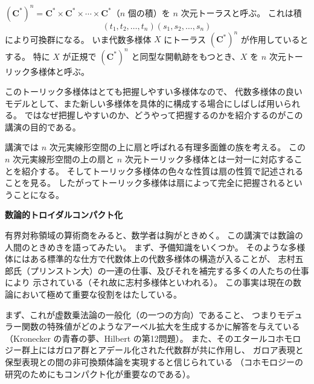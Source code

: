\documentclass[uplatex,dvipdfmx]{jlreq}
\begin{document}
\medskip
\hspace*{\fill}{\large\bfseries 石井志保子（東工大・理）}

\bigskip\bigskip

$(\mathbf{C}^*)^n = \mathbf{C}^* \times \mathbf{C}^* \times \cdots \times \mathbf{C}^*$（$n$ 個の積）を $n$ 次元トーラスと呼ぶ。
これは積
\[
  (t_1, t_2, \ldots, t_n)(s_1, s_2, \ldots, s_n)
\]
により可換群になる。
いま代数多様体 $X$ にトーラス $(\mathbf{C}^*)^n$ が作用しているとする。
特に $X$ が正規で $(\mathbf{C}^*)^n$ と同型な開軌跡をもつとき、$X$ を $n$ 次元トーリック多様体と呼ぶ。

このトーリック多様体はとても把握しやすい多様体なので、
代数多様体の良いモデルとして、また新しい多様体を具体的に構成する場合にしばしば用いられる。
ではなぜ把握しやすいのか、どうやって把握するのかを紹介するのがこの講演の目的である。

講演では $n$ 次元実線形空間の上に扇と呼ばれる有理多面錐の族を考える。
この $n$ 次元実線形空間の上の扇と $n$ 次元トーリック多様体とは一対一に対応することを紹介する。
そしてトーリック多様体の色々な性質は扇の性質で記述されることを見る。
したがってトーリック多様体は扇によって完全に把握されるということになる。

\newpage

\noindent
{\large\bfseries 数論的トロイダルコンパクト化}

\medskip
\hspace*{\fill}{\large\bfseries 藤原 一宏（名大・多元数理）}

\bigskip\bigskip

有界対称領域の算術商をみると、数学者は胸がときめく。
この講演では数論の人間のときめきを語ってみたい。
まず、予備知識をいくつか。
そのような多様体にはある標準的な仕方で代数体上の代数多様体の構造が入ることが、
志村五郎氏（プリンストン大）の一連の仕事、及びそれを補完する多くの人たちの仕事により
示されている（それ故に志村多様体といわれる）。
この事実は現在の数論において極めて重要な役割をはたしている。

まず、これが虚数乗法論の一般化（の一つの方向）であること、
つまりモデュラー関数の特殊値がどのようなアーベル拡大を生成するかに解答を与えている
（Kronecker の青春の夢、Hilbert の第12問題）。
また、そのエタールコホモロジー群上にはガロア群とアデール化された代数群が共に作用し、
ガロア表現と保型表現との間の非可換類体論を実現すると信じられている
（コホモロジーの研究のためにもコンパクト化が重要なのである）。
\end{document}
